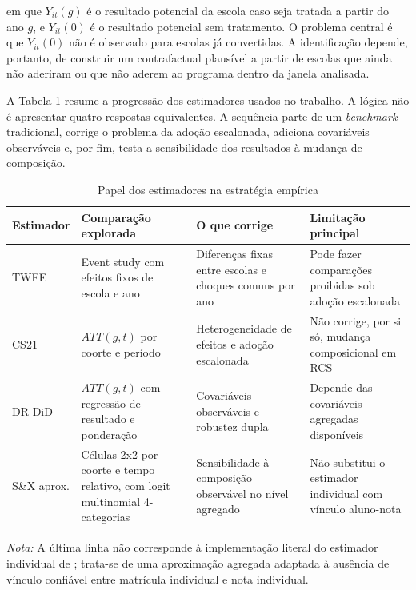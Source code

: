 em que $Y_{it}(g)$ é o resultado potencial da escola caso seja tratada a partir do ano $g$, e $Y_{it}(0)$ é o resultado potencial sem tratamento. O problema central é que $Y_{it}(0)$ não é observado para escolas já convertidas. A identificação depende, portanto, de construir um contrafactual plausível a partir de escolas que ainda não aderiram ou que não aderem ao programa dentro da janela analisada.

A Tabela \ref{tab:estimadores} resume a progressão dos estimadores usados no trabalho. A lógica não é apresentar quatro respostas equivalentes. A sequência parte de um \textit{benchmark} tradicional, corrige o problema da adoção escalonada, adiciona covariáveis observáveis e, por fim, testa a sensibilidade dos resultados à mudança de composição.

\begin{table}[htbp]
\centering
\caption{Papel dos estimadores na estratégia empírica}
\label{tab:estimadores}
\small
\begin{threeparttable}
\begin{tabular}{p{2.4cm}p{3.3cm}p{3.7cm}p{3.5cm}}
\toprule
Estimador & Comparação explorada & O que corrige & Limitação principal \\
\midrule
TWFE & Event study com efeitos fixos de escola e ano & Diferenças fixas entre escolas e choques comuns por ano & Pode fazer comparações proibidas sob adoção escalonada \\
CS21 & $ATT(g,t)$ por coorte e período & Heterogeneidade de efeitos e adoção escalonada & Não corrige, por si só, mudança composicional em RCS \\
DR-DiD & $ATT(g,t)$ com regressão de resultado e ponderação & Covariáveis observáveis e robustez dupla & Depende das covariáveis agregadas disponíveis \\
S\&X aprox. & Células 2x2 por coorte e tempo relativo, com logit multinomial 4-categorias & Sensibilidade à composição observável no nível agregado & Não substitui o estimador individual com vínculo aluno-nota \\
\bottomrule
\end{tabular}
\begin{tablenotes}
\footnotesize
\item \textit{Nota:} A última linha não corresponde à implementação literal do estimador individual de \textcite{santannaxu}; trata-se de uma aproximação agregada adaptada à ausência de vínculo confiável entre matrícula individual e nota individual.
\end{tablenotes}
\end{threeparttable}
\end{table}

